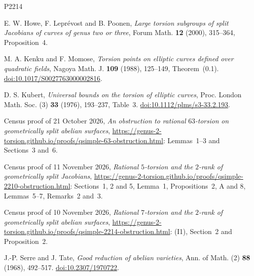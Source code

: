 \documentclass[11pt]{article}
\begin{document}
\begin{thebibliography}{P2214}

E. W. Howe, F. Leprévost and B. Poonen, \emph{Large torsion subgroups of split Jacobians of curves of
genus two or three}, Forum Math. \textbf{12} (2000), 315--364, Proposition~4.

M. A. Kenku and F. Momose, \emph{Torsion points on elliptic curves defined over quadratic fields},
Nagoya Math. J. \textbf{109} (1988), 125--149, Theorem~(0.1).
\href{https://doi.org/10.1017/S0027763000002816}{doi:10.1017/S0027763000002816}.

D. S. Kubert, \emph{Universal bounds on the torsion of elliptic curves}, Proc. London Math. Soc. (3)
\textbf{33} (1976), 193--237, Table~3.
\href{https://doi.org/10.1112/plms/s3-33.2.193}{doi:10.1112/plms/s3-33.2.193}.

Census proof of 21 October 2026, \emph{An obstruction to rational \(63\)-torsion on geometrically
split abelian surfaces},
\url{https://genus-2-torsion.github.io/proofs/qsimple-63-obstruction.html}: Lemmas~1--3 and
Sections~3 and~6.

Census proof of 11 November 2026, \emph{Rational \(5\)-torsion and the \(2\)-rank of geometrically
split Jacobians},
\url{https://genus-2-torsion.github.io/proofs/qsimple-2210-obstruction.html}: Sections~1, 2 and 5,
Lemma~1, Propositions~2, A and 8, Lemmas~5--7, Remarks~2 and~3.

Census proof of 10 November 2026, \emph{Rational \(7\)-torsion and the \(2\)-rank of
geometrically split abelian surfaces},
\url{https://genus-2-torsion.github.io/proofs/qsimple-2214-obstruction.html}: (I1), Section~2 and
Proposition~2.

J.-P. Serre and J. Tate, \emph{Good reduction of abelian varieties}, Ann. of Math. (2)
\textbf{88} (1968), 492--517. \href{https://doi.org/10.2307/1970722}{doi:10.2307/1970722}.

\end{thebibliography}
\end{document}
